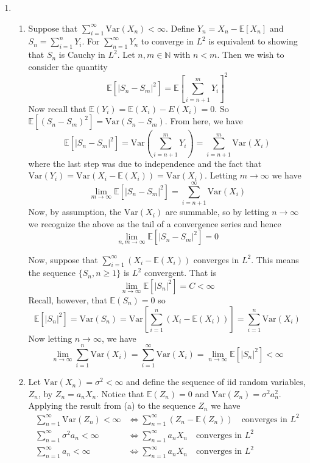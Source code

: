 \documentclass[12pt]{article}  %
\newcommand{\N}{{\mathbb{N}}}
\newcommand{\nsum}{{\sum_{i=1}^n}}
\newcommand{\E}{{\mathbb{E}}}
\newcommand{\V}{{\text{Var}}}
\begin{document}
\begin{enumerate}
\item 
\begin{enumerate}
\item Suppose that $\sum_{i=1}^{\infty}\V(X_n)<\infty$. Define $Y_n = X_n - \E[X_n]$ and $S_n = \nsum Y_i$. For $\sum_{n=1}^{\infty}Y_n$ to converge in $L^2$ is equivalent to showing that $S_n$ is Cauchy in $L^2$. Let $n,m\in\N$ with $n<m$. Then we wish to consider the quantity $$\E[|S_n - S_m|^2] = \E\left[\sum_{i = n + 1}^{m}Y_i\right]^2$$ 
Now recall that $\E(Y_i) = \E(X_i) - E(X_i) = 0$. So $\E[(S_n - S_m)^2] = \V(S_n - S_m)$. From here, we have $$\E[|S_n - S_m|^2] = \V\left(\sum_{i = n+1}^m Y_i\right) = \sum_{i = n+1}^m\V(X_i)$$ where the last step was due to independence and the fact that $\V(Y_i) = \V(X_i - \E(X_i)) = \V(X_i)$. Letting $m\to \infty$ we have $$\lim_{m\to\infty}\E[|S_n - S_m|^2] = \sum_{i = n+1}^{\infty}\V(X_i)$$ Now, by assumption, the $\V(X_i)$ are summable, so by letting $n\to\infty$ we recognize the above as the tail of a convergence series and hence $$\lim_{n,m\to\infty}\E[|S_n - S_m|^2] = 0$$

Now, suppose that $\sum_{i=1}^{\infty}(X_i - \E(X_i))$ converges in $L^2$. This means the sequence $\{S_n, n\geq 1\}$ is $L^2$ convergent. That is $$\lim_{n\to\infty}\E[|S_n|^2] = C<\infty$$ Recall, however, that $\E(S_n) = 0$ so $$\E[|S_n|^2] = \V(S_n) = \V\left[\sum_{i=1}^{n}(X_i-\E(X_i))\right] = \sum_{i=1}^{n}\V(X_i)$$ Now letting $n\to\infty$, we have $$\lim_{n\to\infty}\sum_{i=1}^{n}\V(X_i) = \sum_{i=1}^{\infty}\V(X_i)= \lim_{n\to\infty}\E[|S_n|^2] < \infty$$ 

\item Let $\V(X_n) = \sigma^2<\infty$ and define the sequence of iid random variables, $Z_n$, by $Z_n = a_nX_n$. Notice that $\E(Z_n) = 0$ and $\V(Z_n)= \sigma^2a_n^2$. Applying the result from (a) to the sequence $Z_n$ we have
\begin{align*}
\sum_{n=1}^{\infty}\V(Z_n)<\infty &\iff \sum_{n=1}^{\infty}(Z_n - \E(Z_n))\hspace{1em}\text{converges in }L^2\\
\sum_{n=1}^{\infty}\sigma^2a_n<\infty &\iff \sum_{n=1}^{\infty}a_nX_n \hspace{1em}\text{converges in }L^2\\
\sum_{n=1}^{\infty}a_n<\infty &\iff \sum_{n=1}^{\infty}a_nX_n \hspace{1em}\text{converges in }L^2\\
\end{align*}

\end{enumerate}



\end{enumerate}	
\end{document}
